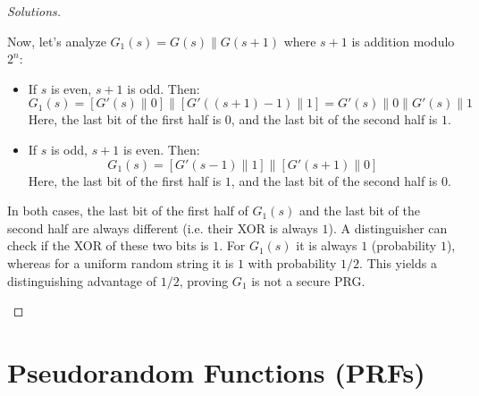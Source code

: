 \documentclass{article}
\begin{document}
\begin{proof}[Solutions]
\begin{enumerate}
    Now, let's analyze $G_1(s) = G(s) \parallel G(s+1)$ where $s+1$ is addition modulo $2^n$:
    \begin{itemize}
        \item If $s$ is even, $s+1$ is odd. Then:
        \[
        G_1(s) = [G'(s) \parallel 0] \parallel [G'((s+1)-1) \parallel 1] = G'(s) \parallel 0 \parallel G'(s) \parallel 1
        \]
        Here, the last bit of the first half is $0$, and the last bit of the second half is $1$.
        \item If $s$ is odd, $s+1$ is even. Then:
        \[
        G_1(s) = [G'(s-1) \parallel 1] \parallel [G'(s+1) \parallel 0]
        \]
        Here, the last bit of the first half is $1$, and the last bit of the second half is $0$.
    \end{itemize}
    In both cases, the last bit of the first half of $G_1(s)$ and the last bit of the second half are always different (i.e. their XOR is always $1$). A distinguisher can check if the XOR of these two bits is $1$. For $G_1(s)$ it is always $1$ (probability $1$), whereas for a uniform random string it is $1$ with probability $1/2$. This yields a distinguishing advantage of $1/2$, proving $G_1$ is not a secure PRG.
\end{enumerate}
\end{proof}

\section{Pseudorandom Functions (PRFs)}
\end{document}
